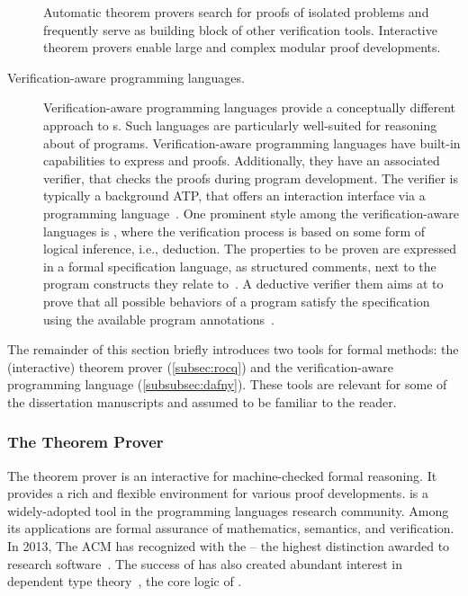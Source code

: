 \begin{description}
Automatic theorem provers search for proofs of
isolated problems and frequently serve as building block of other verification
tools. Interactive theorem provers enable large and
complex modular proof developments.

\item[Verification-aware programming languages.]
Verification-aware programming languages provide a conceptually different
approach to s. Such languages are particularly well-suited
for reasoning about  of programs. Verification-aware
programming languages have built-in capabilities to express 
and proofs. Additionally, they have an associated verifier, that checks the
proofs during program development. The verifier is typically a background ATP,
that offers an interaction interface via a programming
language~\cite{leino2023}. One prominent style among the verification-aware
languages is \emph{}, where the verification process
is based on some form of logical inference, i.e., deduction. The properties to
be proven are expressed in a formal specification language, as structured
comments, next to the program constructs they relate to~\cite{hahnle2019}. A
deductive verifier them aims at to prove that all possible behaviors of a
program satisfy the specification using the available program
annotations~\cite{cassez2022}.
\end{description}

The remainder of this section briefly introduces two tools for formal methods:
the (interactive)  theorem prover (\autoref{subsec:rocq}) and the
verification-aware programming language  (\autoref{subsubsec:dafny}).
These tools are relevant for some of the dissertation manuscripts and assumed to
be familiar to the reader.

\subsubsection{The  Theorem Prover}
\label{subsec:rocq}

The  theorem prover is an interactive  for
machine-checked formal reasoning. It provides a rich and flexible environment
for various proof developments.  is a widely-adopted tool in the
programming languages research community. Among its applications are formal
assurance of mathematics, semantics, and verification. In 2013, The ACM has
recognized  with the
\href{https://awards.acm.org/software-system}{} --
the highest distinction awarded to research software~\cite{rocq-community}. The
success of  has also created abundant interest in dependent type
theory~\cite{coquand1988}, \ie the core logic of
.

